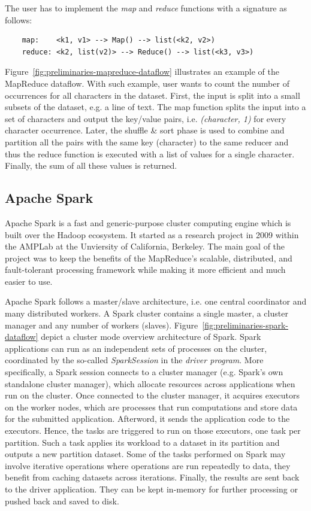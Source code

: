 The  user has to implement the \textit{map} and \textit{reduce} functions with a signature as follows:

\begin{verbatim}
    map:    <k1, v1> --> Map() --> list(<k2, v2>)
    reduce: <k2, list(v2)> --> Reduce() --> list(<k3, v3>)
\end{verbatim}

Figure~\ref{fig:preliminaries-mapreduce-dataflow} illustrates an example of the MapReduce dataflow.
With such example, user wants to count the number of occurrences for all characters in the dataset.
First, the input is split into a small subsets of the dataset, e.g. a line of text.
The map function splits the input into a set of characters and output the key/value pairs, i.e. \textit{(character, 1)} for every character occurrence.
Later, the shuffle \& sort phase is used to combine and partition all the pairs with the same key (character) to the same reducer and thus the reduce function is executed with a list of values for a single character.
Finally, the sum of all these values is returned.

\subsection{Apache Spark}
Apache Spark is a fast and generic-purpose cluster computing engine which is built over the Hadoop ecosystem.
It started as a research project in 2009 within the AMPLab at the Unviersity of California, Berkeley.
The main goal of the project was to keep the benefits of the MapReduce's scalable, distributed, and fault-tolerant processing framework while making it more efficient and much easier to use.

Apache Spark follows a master/slave architecture, i.e. one central coordinator and many distributed workers.
A Spark cluster contains a single master, a cluster manager and any number of workers (slaves).
Figure~\ref{fig:preliminaries-spark-dataflow} depict a cluster mode overview architecture of Spark.
Spark applications can run as an independent sets of processes on the cluster, coordinated by the so-called \textit{SparkSession} in the \textit{driver program}.
More specifically, a Spark session connects to a cluster manager (e.g. Spark's own standalone cluster manager), which allocate resources across applications when run on the cluster.
Once connected to the cluster manager, it acquires executors on the worker nodes, which are processes that run computations and store data for the submitted application.
Afterword, it sends the application code to the executors. 
Hence, the tasks are triggered to run on those executors, one task per partition.
Such a task applies its workload to a dataset in its partition and outputs a new partition dataset.
Some of the tasks performed on Spark may involve iterative operations where operations are run repeatedly to data, they benefit from caching datasets across iterations.
Finally, the results are sent back to the driver application.
They can be kept in-memory for further processing or pushed back and saved to disk.

